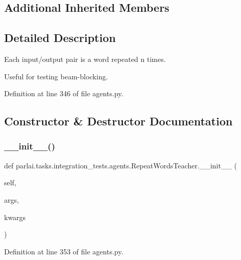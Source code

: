 \subsection*{Additional Inherited Members}


\subsection{Detailed Description}
\begin{DoxyVerb}Each input/output pair is a word repeated n times.

Useful for testing beam-blocking.
\end{DoxyVerb}
 

Definition at line 346 of file agents.\+py.



\subsection{Constructor \& Destructor Documentation}
\mbox{\label{classparlai_1_1tasks_1_1integration__tests_1_1agents_1_1RepeatWordsTeacher_a169b9a70cebc4aeb54e4b90ddba644ac}} 
\subsubsection{\texorpdfstring{\+\_\+\+\_\+init\+\_\+\+\_\+()}{\_\_init\_\_()}}
{\footnotesize\ttfamily def parlai.\+tasks.\+integration\+\_\+tests.\+agents.\+Repeat\+Words\+Teacher.\+\_\+\+\_\+init\+\_\+\+\_\+ (\begin{DoxyParamCaption}\item[{}]{self,  }\item[{}]{args,  }\item[{}]{kwargs }\end{DoxyParamCaption})}



Definition at line 353 of file agents.\+py.


